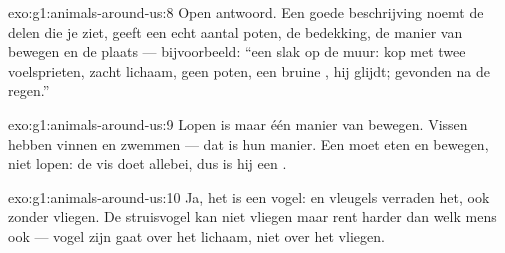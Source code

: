 \begin{solution}{exo:g1:animals-around-us:8}
Open antwoord. Een goede beschrijving noemt de delen die je ziet,
geeft een echt aantal poten, de bedekking, de manier van bewegen en de
plaats --- bijvoorbeeld: ``een slak op de muur: kop met twee voelsprieten,
zacht lichaam, geen poten, een bruine , hij glijdt; gevonden na de regen.''
\end{solution}

\begin{solution}{exo:g1:animals-around-us:9}
Lopen is maar één manier van bewegen. Vissen hebben vinnen en zwemmen
--- dat is hun manier. Een  moet eten en bewegen, niet lopen: de
vis doet allebei, dus is hij een .
\end{solution}

\begin{solution}{exo:g1:animals-around-us:10}
Ja, het is een vogel:  en vleugels verraden het, ook zonder
vliegen. De struisvogel kan niet vliegen maar rent harder dan welk
mens ook --- vogel zijn gaat over het lichaam, niet over het vliegen.
\end{solution}
